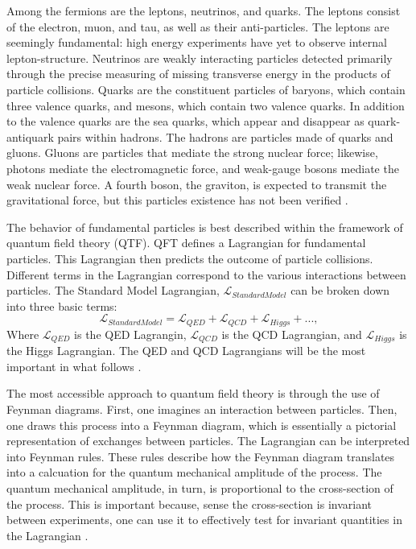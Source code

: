 Among the fermions are the leptons, neutrinos, and quarks. The leptons consist of the electron, muon, and tau, as well as their anti-particles. The leptons are seemingly fundamental: high energy experiments have yet to observe internal lepton-structure. Neutrinos are weakly interacting particles detected primarily through the precise measuring of missing transverse energy in the products of particle collisions. Quarks are the constituent particles of baryons, which contain three valence quarks, and mesons, which contain two valence quarks. In addition to the valence quarks are the sea quarks, which appear and disappear as quark-antiquark pairs within hadrons. The hadrons are particles made of quarks and gluons. Gluons are particles that mediate the strong nuclear force; likewise, photons mediate the electromagnetic force, and weak-gauge bosons mediate the weak nuclear force. A fourth boson, the graviton, is expected to transmit the gravitational force, but this particles existence has not been verified \cite{Halzen:1984mc}. 

The behavior of fundamental particles is best described within the framework of quantum field theory (QTF). QFT defines a Lagrangian for fundamental particles. This Lagrangian then predicts the outcome of particle collisions. Different terms in the Lagrangian correspond to the various interactions between particles. The Standard Model Lagrangian, $\mathcal{L}_{Standard Model}$ can be broken down into three basic terms:	
\begin{equation}
\mathcal{L}_{Standard Model} = \mathcal{L}_{QED} + \mathcal{L}_{QCD} + \mathcal{L}_{Higgs} + ... ,  
\end{equation} 
Where $\mathcal{L}_{QED}$ is the QED Lagrangin, $\mathcal{L}_{QCD}$ is the QCD Lagrangian, and $\mathcal{L}_{Higgs}$ is the Higgs Lagrangian. The QED and QCD Lagrangians will be the most important in what follows \cite{Halzen:1984mc}. 

The most accessible approach to quantum field theory is through the use of Feynman diagrams. First, one imagines an interaction between particles. Then, one draws this process into a Feynman diagram, which is essentially a pictorial representation of exchanges between particles. The Lagrangian can be interpreted into Feynman rules. These rules describe how the Feynman diagram translates into a calcuation for the quantum mechanical amplitude of the process. The quantum mechanical amplitude, in turn, is proportional to the cross-section of the process. This is important because, sense the cross-section is invariant between experiments, one can use it to effectively test for invariant quantities in the Lagrangian \cite{Peskin:1995ev}.

